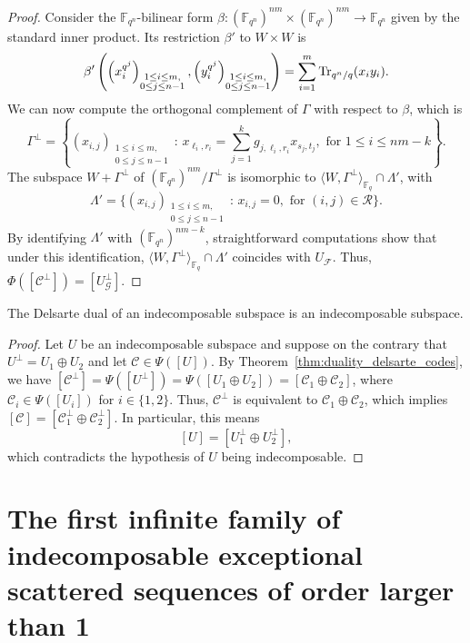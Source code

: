 \begin{proof}
    Consider the ${\mathbb F}_{q^n}$-bilinear form $\beta:(\mathbb{F}_{q^n})^{nm}\times (\mathbb{F}_{q^n})^{nm}\rightarrow {\mathbb F}_{q^n}$ given by the standard inner product. Its restriction $\beta'$ to $W\times W$ is 
    $$\beta'\left(\left(x_{i}^{q^j}\right)_{\substack{1\leq i \leq m,\\  0 \leq j \leq n-1}},\left(y_{i}^{q^j}\right)_{\substack{1\leq i \leq m,\\  0 \leq j \leq n-1}}\right)=\sum_{i=1}^m{\rm Tr}_{q^n/q}(x_iy_i).$$ 
    We can now compute the orthogonal complement of $\Gamma$ with respect to $\beta$, which is
    $$\Gamma^\perp=\left\{  (x_{i,j})_{\substack{1\leq i \leq m,\\  0 \leq j \leq n-1}}  \,:\, x_{\ell_i,r_i}=\sum_{j=1}^kg_{j,\ell_i,r_i}x_{s_j,t_j}, \mbox{ for }  1 \le i \le nm-k  \right\}.$$
    The subspace $W+\Gamma^\perp$ of $(\mathbb{F}_{q^n})^{nm}/\Gamma^\perp$ is isomorphic to $\langle W,\Gamma^\perp\rangle_{\mathbb{F}_q}\cap\Lambda'$, with 
    $$\Lambda'=\{(x_{i,j})_{\substack{1\leq i \leq m,\\  0 \leq j \leq n-1}}  \,:\,x_{i,j}=0, \mbox{ for } (i,j)\in\mathcal R\}.$$
    By identifying $\Lambda'$ with $(\mathbb{F}_{q^n})^{nm-k}$, straightforward computations show that under this identification, $\langle W,\Gamma^\perp\rangle_{\mathbb{F}_q}\cap\Lambda'$ coincides with $U_{\mathcal F}$. Thus, $\Phi([\mathcal{C}^\perp])=[U_{\mathcal G}^\perp]$.
\end{proof}


\begin{prop}
 The Delsarte dual of an indecomposable subspace is an indecomposable subspace.
\end{prop}

\begin{proof}
Let $U$ be an indecomposable subspace and suppose on the contrary that $U^\perp=U_1\oplus U_2$ and let $\mathcal{C} \in \Psi([U])$. By Theorem~\ref{thm:duality_delsarte_codes}, we have
$[\mathcal{C}^\perp]= \Psi([U^\perp])=\Psi([U_1\oplus U_2])=[\mathcal{C}_1\oplus \mathcal{C}_2]$, where $\mathcal{C}_i \in \Psi([U_i])$ for $i \in \{1,2\}$.
Thus, $\mathcal{C}^\perp$ is equivalent to $\mathcal{C}_1\oplus\mathcal{C}_2$, which implies 
$[\mathcal{C}]=[\mathcal{C}_1^\perp\oplus\mathcal{C}_2^\perp]$. In particular, this means
$$[U]=[U_1^\perp \oplus U_2^\perp],$$
which contradicts the hypothesis of $U$ being indecomposable.
\end{proof}

	
	
\section{The first infinite family of indecomposable exceptional scattered sequences of order larger than 1}\label{sec:construction}

